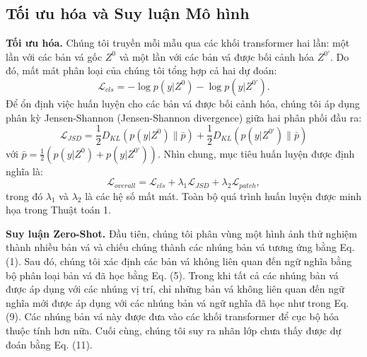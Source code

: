 \subsection{Tối ưu hóa và Suy luận Mô hình}
\textbf{Tối ưu hóa.} Chúng tôi truyền mỗi mẫu qua các khối transformer hai lần: một lần với các bản vá gốc $Z^0$ và một lần với các bản vá được bối cảnh hóa $Z^{0'}$. Do đó, mất mát phân loại của chúng tôi tổng hợp cả hai dự đoán:
\begin{equation}
\mathcal{L}_{cls} = -\log p(y|Z^0) - \log p(y|Z^{0'}).
\end{equation}
Để ổn định việc huấn luyện cho các bản vá được bối cảnh hóa, chúng tôi áp dụng phân kỳ Jensen-Shannon (Jensen-Shannon divergence) giữa hai phân phối đầu ra:
\begin{equation}
\mathcal{L}_{JSD} = \frac{1}{2} D_{KL}(p(y|Z^0) \parallel \bar{p}) + \frac{1}{2} D_{KL}(p(y|Z^{0'}) \parallel \bar{p})
\end{equation}
với $\bar{p} = \frac{1}{2}(p(y|Z^0) + p(y|Z^{0'}))$.
Nhìn chung, mục tiêu huấn luyện được định nghĩa là:
\begin{equation}
\mathcal{L}_{overall} = \mathcal{L}_{cls} + \lambda_1 \mathcal{L}_{JSD} + \lambda_2 \mathcal{L}_{patch},
\end{equation}
trong đó $\lambda_1$ và $\lambda_2$ là các hệ số mất mát. Toàn bộ quá trình huấn luyện được minh họa trong Thuật toán 1.

\textbf{Suy luận Zero-Shot.} Đầu tiên, chúng tôi phân vùng một hình ảnh thử nghiệm thành nhiều bản vá và chiếu chúng thành các nhúng bản vá tương ứng bằng Eq. (1). Sau đó, chúng tôi xác định các bản vá không liên quan đến ngữ nghĩa bằng bộ phân loại bản vá đã học bằng Eq. (5). Trong khi tất cả các nhúng bản vá được áp dụng với các nhúng vị trí, chỉ những bản vá không liên quan đến ngữ nghĩa mới được áp dụng với các nhúng bản vá ngữ nghĩa đã học như trong Eq. (9). Các nhúng bản vá này được đưa vào các khối transformer để cục bộ hóa thuộc tính hơn nữa. Cuối cùng, chúng tôi suy ra nhãn lớp chưa thấy được dự đoán bằng Eq. (11).
